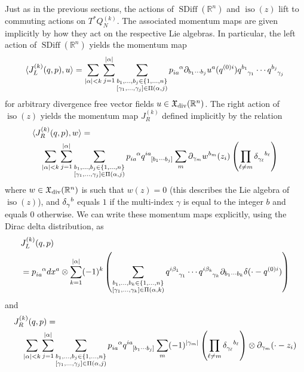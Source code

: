 \documentclass[12pt]{amsart}
\newcommand{\R}{\ensuremath{\mathbb{R}}}
\DeclareMathOperator{\SDiff}{SDiff}
\DeclareMathOperator{\iso}{iso}
\begin{document}
  Just as in the previous sections, the actions of $\SDiff(\R^n)$ and $\iso(z)$ lift to commuting actions on $T^*Q_N^{(k)}$.
  The associated momentum maps are given implicitly by how they act on the respective Lie algebras.
  In particular, the left action of $\SDiff(\R^n)$ yields the momentum map
  \begin{align*}
  	\langle J_L^{(k)}(q,p) , u \rangle = \sum_{|\alpha| < k } \sum_{j = 1}^{|\alpha|}
		\sum_{
			\substack{
				b_1,\dots,b_j \in \{1,\dots,n\} \\
				[\gamma_1,\dots,\gamma_j] \in \Pi(\alpha,j)
				}
			}
			p \indices{_{ia}^{\alpha}} \partial_{b_1 \cdots b_j}u^a ( q^{(0)i})  q\indices{^{b_1}_{\gamma_1}} \cdots q\indices{^{b_j}_{\gamma_j}}
  \end{align*}
  for arbitrary divergence free vector fields $u \in \mathfrak{X}_{\rm div}(\R^n)$.
  The right action of $\iso(z)$ yields the momentum map $J_R^{(k)}$ defined implicitly by the relation
  \begin{align*}
  &\langle J_R^{(k)}(q,p) , w \rangle = \\
  &\quad \sum_{ | \alpha | < k } \sum_{j=1}^{|\alpha|}
		\sum_{
			\substack{
				b_1,\dots,b_j \in \{1,\dots,n\} \\
				[\gamma_1,\dots,\gamma_j] \in \Pi(\alpha,j)
				}
			}
			p\indices{_{ia}^\alpha} q\indices{^{ia}_{[b_1 \cdots b_j]}}   \sum_{m}  \partial_{\gamma_m} w^{b_m}(z_i) \left( \prod_{\ell \neq m }  \delta \indices{_{\gamma_\ell}^{b_\ell}} \right)
  \end{align*}
  where $w \in \mathfrak{X}_{\rm div}(\R^n)$ is such that $w(z) = 0$ (this describes the Lie algebra of $\iso(z)$),
  and $\delta\indices{_{\gamma}^{b}}$ equals $1$ if the multi-index $\gamma$ is equal to the integer $b$
  and equals $0$ otherwise.
  We can write these momentum maps explicitly, using the Dirac delta distribution, as
  \begin{align*}
    &J_L^{(k)}(q,p) \\
    &= p \indices{_{ia}^{\alpha}} dx^a \otimes
    \sum_{k=1}^{|\alpha|} (-1)^{k}
    \left(
      \sum_{\substack{
          b_1,\dots,b_k \in \{1,\dots,n\} \\
          [\gamma_1,\dots,\gamma_k] \in \Pi( \alpha,k)
          }
        }
      q\indices{^{i\beta_1}_{\gamma_1}} \cdots q\indices{^{i\beta_k}_{\gamma_k}}
      \partial_{b_1 \cdots b_k} \delta(\cdot - q^{(0)i}) \right)
    \end{align*}
    and
  \begin{align*}
  & J_R^{(k)}(q,p) = \\
  &\quad \sum_{ | \alpha | < k } \sum_{j=1}^{|\alpha|}
		\sum_{
			\substack{
				b_1,\dots,b_j \in \{1,\dots,n\} \\
				[\gamma_1,\dots,\gamma_j] \in \Pi(\alpha,j)
				}
			}
			p\indices{_{ia}^\alpha} q\indices{^{ia}_{[b_1 \cdots b_j]}}   \sum_{m}  (-1)^{|\gamma_m|}\left( \prod_{\ell \neq m }  \delta \indices{_{\gamma_\ell}^{b_\ell}} \right) \otimes \partial_{\gamma_m}( \cdot - z_i)
  \end{align*}
\end{document}
